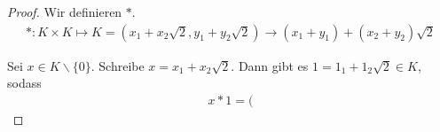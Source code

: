 \documentclass[a4paper,10pt]{article}
\begin{document}
\begin{proof}
 Wir definieren $*$.
 \begin{align*}
  *: K \times K \mapsto K = (x_1 + x_2\sqrt{2}, y_1 + y_2\sqrt{2}) \rightarrow (x_1 + y_1) + (x_2 + y_2)\sqrt{2}
 \end{align*}

 
 Sei $x \in K\backslash\{0\}$.
 Schreibe $x = x_1 + x_2\sqrt{2}$.
 Dann gibt es $1 = 1_1 + 1_2\sqrt{2} \in K$, sodass
 \begin{align*}
  x * 1 = (
 \end{align*}

\end{proof}
\end{document}
